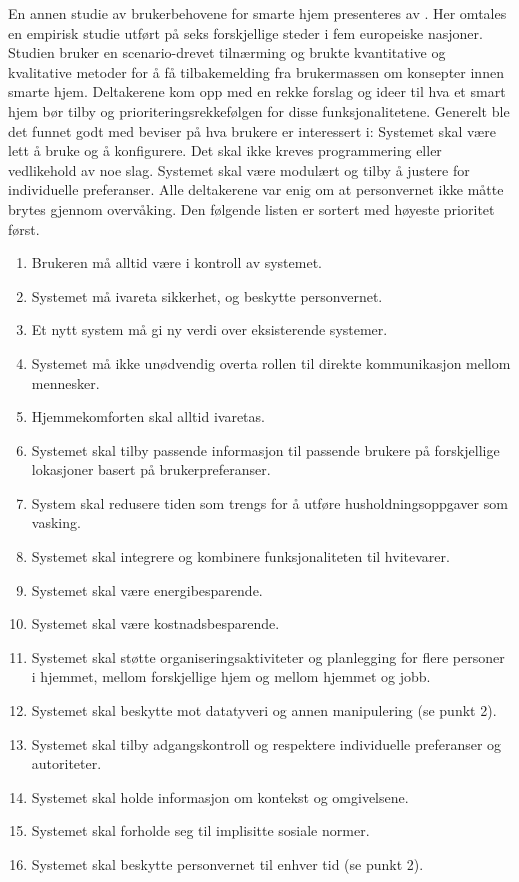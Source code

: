 En annen studie av brukerbehovene for smarte hjem presenteres av \citet{userreq}. Her omtales en empirisk studie utført på seks forskjellige steder i fem europeiske nasjoner. Studien bruker en scenario-drevet tilnærming og brukte kvantitative og kvalitative metoder for å få tilbakemelding fra brukermassen om konsepter innen smarte hjem. Deltakerene kom opp med en rekke forslag og ideer til hva et smart hjem bør tilby og prioriteringsrekkefølgen for disse funksjonalitetene. Generelt ble det funnet godt med beviser på hva brukere er interessert i: Systemet skal være lett å bruke og å konfigurere. Det skal ikke kreves programmering eller vedlikehold av noe slag. Systemet skal være modulært og tilby å justere for individuelle preferanser. Alle deltakerene var enig om at personvernet ikke måtte brytes gjennom overvåking. Den følgende listen er sortert med høyeste prioritet først.
\begin{enumerate}
  \item Brukeren må alltid være i kontroll av systemet.
  \item Systemet må ivareta sikkerhet, og beskytte personvernet.
  \item Et nytt system må gi ny verdi over eksisterende systemer.
  \item Systemet må ikke unødvendig overta rollen til direkte kommunikasjon mellom mennesker.
  \item Hjemmekomforten skal alltid ivaretas.
  \item Systemet skal tilby passende informasjon til passende brukere på forskjellige lokasjoner basert på brukerpreferanser.
  \item System skal redusere tiden som trengs for å utføre husholdningsoppgaver som vasking.
  \item Systemet skal integrere og kombinere funksjonaliteten til hvitevarer.
  \item Systemet skal være energibesparende.
  \item Systemet skal være kostnadsbesparende.
  \item Systemet skal støtte organiseringsaktiviteter og planlegging for flere personer i hjemmet, mellom forskjellige hjem og mellom hjemmet og jobb.
  \item Systemet skal beskytte mot datatyveri og annen manipulering (se punkt 2).
  \item Systemet skal tilby adgangskontroll og respektere individuelle preferanser og autoriteter.
  \item Systemet skal holde informasjon om kontekst og omgivelsene.
  \item Systemet skal forholde seg til implisitte sosiale normer.
  \item Systemet skal beskytte personvernet til enhver tid (se punkt 2).
\end{enumerate}

